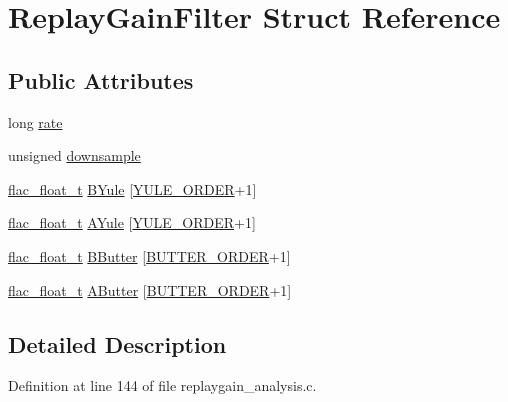 \hypertarget{struct_replay_gain_filter}{}\section{Replay\+Gain\+Filter Struct Reference}
\label{struct_replay_gain_filter}
\subsection*{Public Attributes}
\begin{DoxyCompactItemize}
\item 
long \hyperlink{struct_replay_gain_filter_a5ae0ffecc9971135049c04bdaaff4908}{rate}
\item 
unsigned \hyperlink{struct_replay_gain_filter_a4a78bc4bc1878b806a36230c2add19b5}{downsample}
\item 
\hyperlink{replaygain__analysis_8h_abc8087d43b5423b38699f7ea959ee32f}{flac\+\_\+float\+\_\+t} \hyperlink{struct_replay_gain_filter_a47d88bce1d1df5d2a4a7c391cd710fc3}{B\+Yule} \mbox{[}\hyperlink{replaygain__analysis_8c_a6e48d077096a381796cf730813c4e7b6}{Y\+U\+L\+E\+\_\+\+O\+R\+D\+ER}+1\mbox{]}
\item 
\hyperlink{replaygain__analysis_8h_abc8087d43b5423b38699f7ea959ee32f}{flac\+\_\+float\+\_\+t} \hyperlink{struct_replay_gain_filter_a308645ad3bbfc0444f1f1c4da997439e}{A\+Yule} \mbox{[}\hyperlink{replaygain__analysis_8c_a6e48d077096a381796cf730813c4e7b6}{Y\+U\+L\+E\+\_\+\+O\+R\+D\+ER}+1\mbox{]}
\item 
\hyperlink{replaygain__analysis_8h_abc8087d43b5423b38699f7ea959ee32f}{flac\+\_\+float\+\_\+t} \hyperlink{struct_replay_gain_filter_abcf3ff4d38499794f51b6c074cf7258d}{B\+Butter} \mbox{[}\hyperlink{replaygain__analysis_8c_a19f16d9b2216a352d4f53718f23e1b1a}{B\+U\+T\+T\+E\+R\+\_\+\+O\+R\+D\+ER}+1\mbox{]}
\item 
\hyperlink{replaygain__analysis_8h_abc8087d43b5423b38699f7ea959ee32f}{flac\+\_\+float\+\_\+t} \hyperlink{struct_replay_gain_filter_aa759f17fb0e2cb02c3b3a5cc11a11a0f}{A\+Butter} \mbox{[}\hyperlink{replaygain__analysis_8c_a19f16d9b2216a352d4f53718f23e1b1a}{B\+U\+T\+T\+E\+R\+\_\+\+O\+R\+D\+ER}+1\mbox{]}
\end{DoxyCompactItemize}


\subsection{Detailed Description}


Definition at line 144 of file replaygain\+\_\+analysis.\+c.



